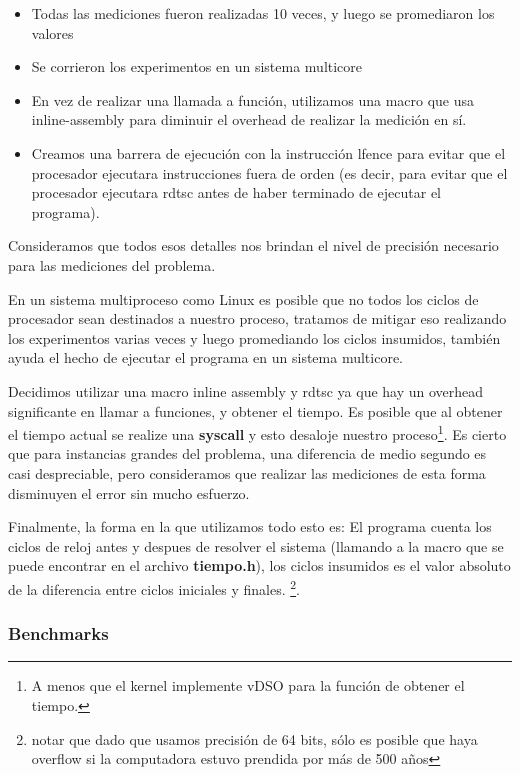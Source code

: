 \begin{itemize}
    \item Todas las mediciones fueron realizadas 10 veces, y luego se promediaron los valores
    \item Se corrieron los experimentos en un sistema multicore
    \item En vez de realizar una llamada a función, utilizamos una macro que usa inline-assembly para diminuir el overhead de realizar la medición en sí.
    \item Creamos una barrera de ejecución con la instrucción lfence para evitar que el procesador ejecutara instrucciones fuera de orden (es decir, para evitar que el procesador ejecutara rdtsc antes de haber terminado de ejecutar el programa). 
\end{itemize}

Consideramos que todos esos detalles nos brindan el nivel de precisión necesario para las mediciones del problema. 

En un sistema multiproceso como Linux es posible que no todos los ciclos de procesador sean destinados a nuestro proceso, tratamos de mitigar eso realizando los experimentos varias veces y luego promediando los ciclos insumidos, también ayuda el hecho de ejecutar el programa en un sistema multicore.

Decidimos utilizar una macro inline assembly y rdtsc ya que hay un overhead significante en llamar a funciones, y obtener el tiempo. Es posible que al obtener el tiempo actual se realize una \textbf{syscall} y esto desaloje nuestro proceso\footnote{A menos que el kernel implemente vDSO para la función de obtener el tiempo.}. Es cierto que para instancias grandes del problema, una diferencia de medio segundo es casi despreciable, pero consideramos que realizar las mediciones de esta forma disminuyen el error sin mucho esfuerzo.

Finalmente, la forma en la que utilizamos todo esto es: El programa cuenta los ciclos de reloj antes y despues de resolver el sistema (llamando a la macro que se puede encontrar en el archivo \textbf{tiempo.h}), los ciclos insumidos es el valor absoluto de la diferencia entre ciclos iniciales y finales. \footnote{notar que dado que usamos precisión de 64 bits, sólo es posible que haya overflow si la computadora estuvo prendida por más de 500 años}. 

\subsubsection{Benchmarks}


